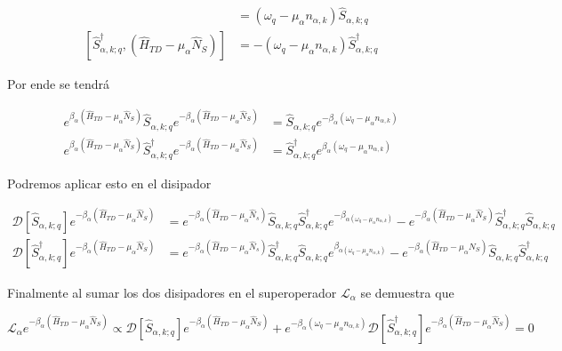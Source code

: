 \begin{appendixs}
\begin{align*}
    [\hat{S}_{\alpha,k;q},(\hat{H}_{TD} - \mu_{\alpha}\hat{N}_{S})] & = (\omega_{q} - \mu_{\alpha}n_{\alpha,k})\hat{S}_{\alpha,k;q}  \\
    [\hat{S}^{\dagger}_{\alpha,k;q},(\hat{H}_{TD} - \mu_{\alpha}\hat{N}_{S})] & = -(\omega_{q} - \mu_{\alpha}n_{\alpha,k})\hat{S}^{\dagger}_{\alpha,k;q}
\end{align*}

 Por ende se tendrá

 \begin{align*}
    e^{\beta_{\alpha}(\hat{H}_{TD} - \mu_{\alpha}\hat{N}_{S})}\hat{S}_{\alpha,k;q} e^{-\beta_{\alpha}(\hat{H}_{TD} - \mu_{\alpha}\hat{N}_{S})} & = \hat{S}_{\alpha,k;q}e^{-\beta_{\alpha}(\omega_{q} - \mu_{\alpha}n_{\alpha,k})} \\
    e^{\beta_{\alpha}(\hat{H}_{TD} - \mu_{\alpha}\hat{N}_{S})}\hat{S}^{\dagger}_{\alpha,k;q} e^{-\beta_{\alpha}(\hat{H}_{TD} - \mu_{\alpha}\hat{N}_{S})} & = \hat{S}^{\dagger}_{\alpha,k;q}e^{\beta_{\alpha}(\omega_{q} - \mu_{\alpha}n_{\alpha,k})}
 \end{align*}

Podremos aplicar esto en el disipador

\begin{align*}
    \mathcal{D}[\hat{S}_{\alpha,k;q}]e^{-\beta_{\alpha}(\hat{H}_{TD} - \mu_{\alpha}\hat{N}_{S})} & =  e^{-\beta_{\alpha}(\hat{H}_{TD} - \mu_{\alpha}\hat{N}_{s})} \hat{S}_{\alpha,k;q}\hat{S}^{\dagger}_{\alpha,k;q} e^{-\beta_{\alpha(\omega_{q} - \mu_{\alpha}n_{\alpha,k})}} - e^{-\beta_{\alpha}(\hat{H}_{TD} - \mu_{\alpha}\hat{N}_{S})} \hat{S}^{\dagger}_{\alpha,k;q}\hat{S}_{\alpha,k;q} \\
    \mathcal{D}[\hat{S}^{\dagger}_{\alpha,k;q}]e^{-\beta_{\alpha}(\hat{H}_{TD} - \mu_{\alpha}\hat{N}_{S})} & = e^{-\beta_{\alpha}(\hat{H}_{TD} - \mu_{\alpha}\hat{N}_{s})} \hat{S}^{\dagger}_{\alpha,k;q}\hat{S}_{\alpha,k;q} e^{\beta_{\alpha(\omega_{q} - \mu_{\alpha}n_{\alpha,k})}} - e^{-\beta_{\alpha}(\hat{H}_{TD} - \mu_{\alpha}\hat{N}_{S})} \hat{S}_{\alpha,k;q}\hat{S}^{\dagger}_{\alpha,k;q} 
\end{align*}

Finalmente al sumar los dos disipadores en el superoperador $\mathcal{L}_{\alpha}$ se demuestra que

\begin{equation*}
    \mathcal{L}_{\alpha}e^{-\beta_{\alpha}(\hat{H}_{TD} - \mu_{\alpha}\hat{N}_{S})} \propto  \mathcal{D}[\hat{S}_{\alpha,k;q}]e^{-\beta_{\alpha}(\hat{H}_{TD} - \mu_{\alpha}\hat{N}_{S})} + e^{-\beta_{\alpha}(\omega_{q} - \mu_{\alpha}n_{\alpha,k})}\mathcal{D}[\hat{S}^{\dagger}_{\alpha,k;q}]e^{-\beta_{\alpha}(\hat{H}_{TD} - \mu_{\alpha}\hat{N}_{S})} = 0
\end{equation*}


\end{appendixs}
